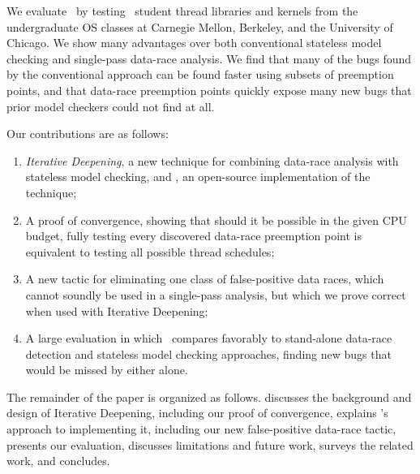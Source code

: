 We evaluate \quicksand~by testing \numstudence~student thread libraries and kernels from the undergraduate OS classes at Carnegie Mellon, Berkeley, and the University of Chicago.
We show many advantages over both conventional stateless model checking and single-pass data-race analysis.
We find that many of the bugs found by the conventional approach can be found faster using subsets of preemption points,
and that data-race preemption points quickly expose many new bugs that prior model checkers could not find at all.

Our contributions are as follows:
\begin{enumerate}
	\item {\em Iterative Deepening}, a new technique for combining data-race analysis with stateless model checking, and \quicksand, an open-source implementation of the technique;
	\item A proof of convergence, showing that should it be possible in the given CPU budget,
		fully testing every discovered data-race preemption point is equivalent to testing all possible thread schedules;
	\item A new tactic for eliminating one class of false-positive data races,
		which cannot soundly be used in a single-pass analysis,
		but which we prove correct when used with Iterative Deepening;
	\item A large evaluation in which \quicksand~compares favorably to stand-alone data-race detection and stateless model checking approaches, finding new bugs that would be missed by either alone.
\end{enumerate}

The remainder of the paper is organized as follows.
\sect{\ref{sec:design}} discusses the background and design of Iterative Deepening, including our proof of convergence,
\sect{\ref{sec:implementation}} explains \quicksand's approach to implementing it, including our new false-positive data-race tactic,
\sect{\ref{sec:eval}} presents our evaluation,
\sect{\ref{sec:future}} discusses limitations and future work,
\sect{\ref{sec:related}} surveys the related work,
and \sect{\ref{sec:conclusion}} concludes.
